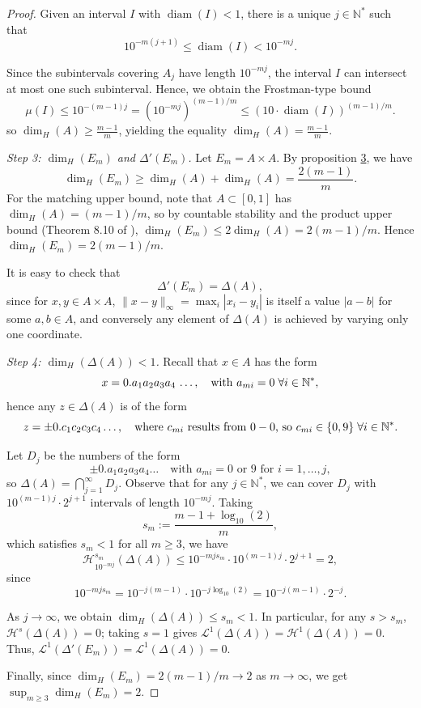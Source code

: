 \documentclass[12pt,a4paper]{report}
\theoremstyle{definition}
\begin{document}
\begin{proof}
Given an interval \(I\) with \(\operatorname{diam}(I) < 1\), there is a unique \(j \in \mathbb{N^*} \) such that
$$
10^{-m(j+1)} \leq \operatorname{diam}(I) < 10^{-mj}.
$$

Since the subintervals covering \(A_j\) have length \(10^{-mj}\), the interval \(I\) can intersect at most one such subinterval. Hence, we obtain the Frostman-type bound
\[
\mu(I) \leq 10^{-(m-1)j} = \left(10^{-mj}\right)^{(m-1)/m} \leq (10 \cdot \operatorname{diam}(I))^{(m-1)/m}.
\]
so \(\dim_H(A) \geq \frac{m-1}{m}\), yielding the equality $\dim_H(A) = \frac{m-1}{m}$.

\noindent
\textit{Step 3: $\dim_H(E_m)$ and $\Delta'(E_m)$.}
Let \( E_m = A \times A \). By proposition \hyperref[prop1.24]{3}, we have
\[
\dim_H(E_m) \geq \dim_H(A) + \dim_H(A) = \frac{2(m-1)}{m}.
\]
For the matching upper bound, note that $A \subset [0,1]$ has $\dim_H(A) = (m-1)/m$, so by countable stability and the product upper bound (Theorem 8.10 of \cite{mattila2012fourier}), $\dim_H(E_m) \leq 2 \dim_H(A) = 2(m-1)/m$. Hence $\dim_H(E_m) = 2(m-1)/m$.

It is easy to check that
\[
\Delta'(E_m) = \Delta(A),
\]
since for $x, y \in A \times A$, $\|x-y\|_\infty = \max_i |x_i - y_i|$ is itself a value $|a-b|$ for some $a, b \in A$, and conversely any element of $\Delta(A)$ is achieved by varying only one coordinate.

\noindent
\textit{Step 4: $\dim_H(\Delta(A)) < 1$.}
Recall that \( x \in A \) has the form
\[
x = 0.a_1 a_2 a_3 a_4\, \ldots, \text{\quad with } a_{mi} = 0 \hspace{0.1 cm} \forall i \in \mathbb{N}^*,
\]
hence any \( z \in \Delta(A) \) is of the form
\[
z=\pm 0.c_1 c_2 c_3 c_4 \ldots, \text{\quad where } c_{mi} \text{ results from $0-0$, so } c_{mi} \in \{0, 9\} \hspace{0.1cm} \forall i \in \mathbb{N}^*.
\]

Let \( D_j \) be the numbers of the form
\[
\pm 0.a_1 a_2 a_3 a_4 \ldots \quad \text{with } a_{mi} = 0 \text{ or } 9 \text{ for } i = 1, \ldots, j,
\]
so \( \Delta(A) = \bigcap_{j=1}^\infty D_j \). Observe that for any \( j \in \mathbb{N}^* \), we can cover \( D_j \) with \( 10^{(m-1)j} \cdot 2^{j+1} \) intervals of length \( 10^{-mj} \). Taking
\begin{equation} \label{eq:sm}
s_m := \frac{m-1 + \log_{10}(2)}{m},
\end{equation}
which satisfies $s_m < 1$ for all $m \geq 3$, we have
\[
\mathcal{H}^{s_m}_{10^{-mj}}(\Delta(A)) \leq 10^{-mj s_m} \cdot 10^{(m-1)j} \cdot 2^{j+1} = 2,
\]
since
\[
10^{-mj s_m} = 10^{-j(m - 1)} \cdot 10^{-j \log_{10}(2)} = 10^{-j(m - 1)} \cdot 2^{-j}.
\]

As \( j \to \infty \), we obtain $\dim_H(\Delta(A)) \leq s_m < 1$. In particular, for any $s > s_m$, $\mathcal{H}^s(\Delta(A)) = 0$; taking $s = 1$ gives $\mathcal{L}^1(\Delta(A)) = \mathcal{H}^1(\Delta(A)) = 0$. Thus, \( \mathcal{L}^1(\Delta'(E_m)) = \mathcal{L}^1(\Delta(A)) = 0 \).

Finally, since $\dim_H(E_m) = 2(m-1)/m \to 2$ as $m \to \infty$, we get $\sup_{m \geq 3} \dim_H(E_m) = 2$.
\end{proof}
\end{document}
